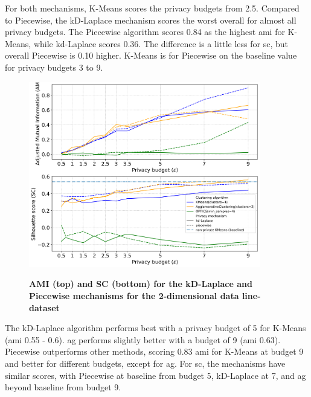 For both mechanisms, K-Means scores the privacy budgets from 2.5.
Compared to Piecewise, the kD-Laplace mechanism scores the worst overall for almost all privacy budgets.
The Piecewise algorithm scores 0.84 as the highest \gls{ami} for K-Means, while kd-Laplace scores 0.36.
The difference is a little less for \gls{sc}, but overall Piecewise is 0.10 higher.
K-Means is for Piecewise on the baseline value for privacy budgets 3 to 9.
\newpage
\begin{figure}[H]
  \centering
  \caption{\textbf{AMI (top) and SC (bottom) for the kD-Laplace and Piecewise mechanisms for the 2-dimensional data line-dataset}}
  \includegraphics[width=0.9\textwidth]{Results/kd-laplace/kd-Laplace/line-dataset/ami-and-sc_2_dimensions.png}
  \label{fig:validation-line-dataset_comparison_2d-laplace}
\end{figure}
The kD-Laplace algorithm performs best with a privacy budget of 5 for K-Means (\gls{ami} 0.55 - 0.6).
\gls{ag} performs slightly better with a budget of 9 (\gls{ami} 0.63).
Piecewise outperforms other methods, scoring 0.83 \gls{ami} for K-Means at budget 9 and better for different budgets, except for \gls{ag}.
For \gls{sc}, the mechanisms have similar scores, with Piecewise at baseline from budget 5, kD-Laplace at 7, and \gls{ag} beyond baseline from budget 9.

